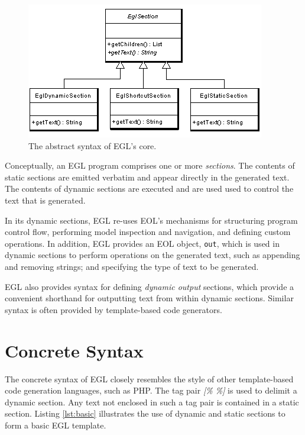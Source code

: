 \begin{figure}[htbp]
  \begin{center}
    \leavevmode
    \includegraphics[scale=0.80]{images/EglAbstractSyntax.png}
  \end{center}
  \caption{The abstract syntax of EGL's core.}
  \label{fig:abstractsyntax}
\end{figure}

Conceptually, an EGL program comprises one or more \emph{sections}. The contents of static
sections are emitted verbatim and appear directly in the
generated text. The contents of dynamic sections are executed and are used
used to control the text that is generated.

In its dynamic sections, EGL re-uses EOL's mechanisms for structuring
program control flow, performing model inspection and navigation, and
defining custom operations. In addition, EGL provides an EOL object, \verb|out|,
which is used in dynamic sections to perform operations on the generated text, 
such as appending and removing strings; and specifying the type of text to be generated.

EGL also provides syntax for defining \textit{dynamic output}
sections, which provide a convenient shorthand for outputting text
from within dynamic sections. Similar syntax is often provided by
template-based code generators.

\section{Concrete Syntax}
\label{concretesyntax}

The concrete syntax of EGL closely resembles the style of other
template-based code generation languages, such as PHP. The tag pair \emph{[\% \%]} is
used to delimit a dynamic section. Any text not enclosed in such a tag
pair is contained in a static section. Listing
\ref{lst:basic} illustrates the use of dynamic and static sections to
form a basic EGL template.

